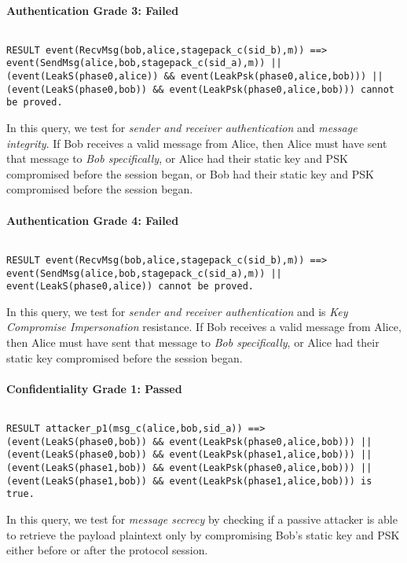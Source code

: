 \paragraph{Authentication Grade 3: Failed}$ $
\begin{lstlisting}
RESULT event(RecvMsg(bob,alice,stagepack_c(sid_b),m)) ==> event(SendMsg(alice,bob,stagepack_c(sid_a),m)) || (event(LeakS(phase0,alice)) && event(LeakPsk(phase0,alice,bob))) || (event(LeakS(phase0,bob)) && event(LeakPsk(phase0,alice,bob))) cannot be proved.
\end{lstlisting}

In this query, we test for \emph{sender and receiver authentication} and \emph{message integrity}. If Bob receives a valid message from Alice, then Alice must have sent that message to \emph{Bob specifically}, or Alice had their static key and PSK compromised before the session began, or Bob had their static key and PSK compromised before the session began.


\paragraph{Authentication Grade 4: Failed}$ $
\begin{lstlisting}
RESULT event(RecvMsg(bob,alice,stagepack_c(sid_b),m)) ==> event(SendMsg(alice,bob,stagepack_c(sid_a),m)) || event(LeakS(phase0,alice)) cannot be proved.
\end{lstlisting}

In this query, we test for \emph{sender and receiver authentication} and is \emph{Key Compromise Impersonation} resistance. If Bob receives a valid message from Alice, then Alice must have sent that message to \emph{Bob specifically}, or Alice had their static key compromised before the session began.


\paragraph{Confidentiality Grade 1: Passed}$ $
\begin{lstlisting}
RESULT attacker_p1(msg_c(alice,bob,sid_a)) ==> (event(LeakS(phase0,bob)) && event(LeakPsk(phase0,alice,bob))) || (event(LeakS(phase0,bob)) && event(LeakPsk(phase1,alice,bob))) || (event(LeakS(phase1,bob)) && event(LeakPsk(phase0,alice,bob))) || (event(LeakS(phase1,bob)) && event(LeakPsk(phase1,alice,bob))) is true.
\end{lstlisting}

In this query, we test for \emph{message secrecy} by checking if a passive attacker is able to retrieve the payload plaintext only by compromising Bob's static key and PSK either before or after the protocol session.


